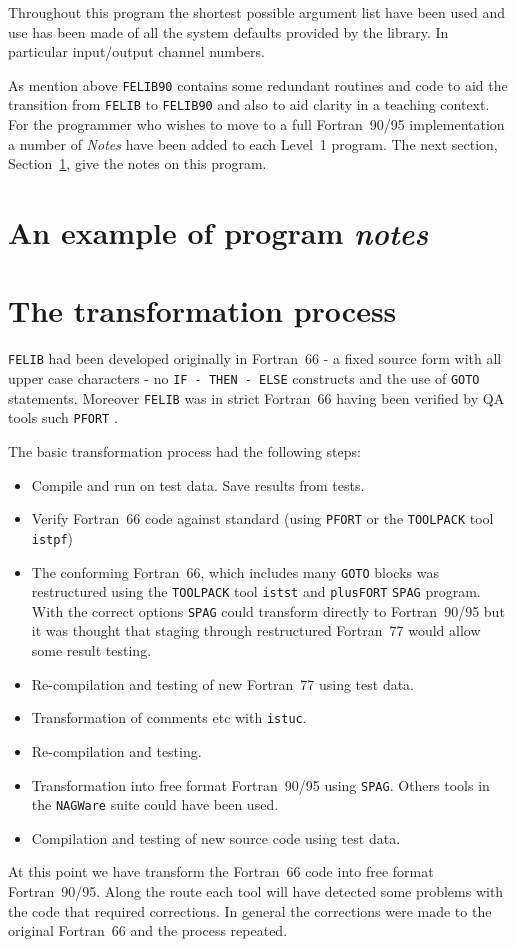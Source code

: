 \documentclass[a4paper,titlepage,11pt]{article}
\begin{document}
Throughout this program the shortest possible argument list have been used and use has
been made of all the system defaults provided by the library. In particular
input/output channel numbers.

As mention above {\tt FELIB90} contains some redundant routines and code to aid
the transition from {\tt FELIB} to {\tt FELIB90} and also to aid clarity in a teaching
context. For the programmer who wishes to move to a full Fortran~90/95
implementation a number of \textit{Notes} have been added to each
Level~1 program. The next section, Section~\ref{notes}, give the notes on this program.

\begin{quote}
\source

\end{quote}

\section{An example of program \textit{notes}}
\label{notes}


\section{The transformation process}
{\tt FELIB} had been developed originally in Fortran~66 - a fixed source form with
all upper case characters - no {\tt IF - THEN - ELSE} constructs and the use of
{\tt GOTO} statements. Moreover {\tt FELIB} was in strict Fortran~66 having been verified
by QA tools such {\tt PFORT} \cite{pfort}.

The basic transformation process had the following steps:
\begin{itemize}
  \item Compile and run on test data. Save results from tests.
	\item Verify Fortran~66 code against standard (using {\tt PFORT} or the {\tt TOOLPACK} tool
	{\tt istpf})
	\item The conforming Fortran~66, which includes many {\tt GOTO} blocks was restructured using
	the {\tt TOOLPACK} tool {\tt istst} and {\tt plusFORT} {\tt SPAG} program. With the correct
	options {\tt SPAG} could transform directly to Fortran~90/95 but it was thought that staging 
	through restructured Fortran~77 would allow some result testing.
	\item Re-compilation and testing of new Fortran~77 using test data.
	\item Transformation of comments etc with {\tt istuc}.
	\item Re-compilation and testing.
	\item Transformation into free format Fortran~90/95 using {\tt SPAG}. Others tools in the 
	{\tt NAGWare} suite could have been used.
	\item Compilation and testing of new source code using test data.
	\end{itemize}
At this point we have transform the Fortran~66 code into free format Fortran~90/95. Along the
route each tool will have detected some problems with the code that required corrections. In
general the corrections were made to the original Fortran~66 and the process repeated.
\end{document}
